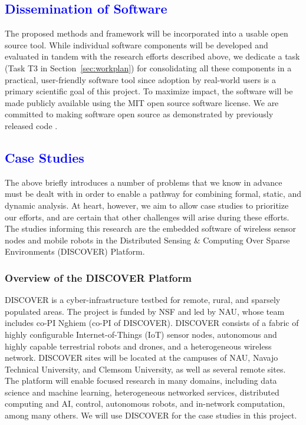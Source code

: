 \subsection{\textcolor{blue}{Dissemination of Software}}
\label{sec:software}

The proposed methods and framework will be incorporated into a usable
open source tool.
While individual software components will be developed and evaluated
in tandem with the research efforts described above, we dedicate a
task (Task T3 in Section~\ref{sec:workplan}) for consolidating all
these components in a practical, user-friendly software tool since
adoption by real-world users is a primary scientific goal of this project.
To maximize impact, the software will be made publicly available %
using the MIT open source software license.
We are committed to making software open source as demonstrated by previously released %
code \cite{mleplussoftware, bernalMLEToolIntegrated2012a, openbuildnetsoftware, nghiemOpenBuildNetFrameworkDistributed2016}.


\subsection{\textcolor{blue}{Case Studies}} %
\label{sec:case-study}

The above briefly introduces a number of problems that we know in advance must
be dealt with in order to enable a pathway for combining formal,
static, and dynamic analysis.    At heart, however, we aim to allow
case studies to prioritize our efforts, and
are certain that other challenges will arise during these efforts.
The studies informing this research are the embedded software of %
wireless sensor nodes and mobile robots in the Distributed Sensing \& Computing Over Sparse Environments (DISCOVER) Platform.

\subsubsection{Overview of the DISCOVER Platform}
\label{sec:cast-study:discover}

DISCOVER %
is a cyber-infrastructure testbed for remote, rural, and sparsely populated areas.
The project is funded by NSF and led by NAU, whose team includes co-PI Nghiem (co-PI of DISCOVER).
DISCOVER consists of a fabric of highly configurable Internet-of-Things (IoT) sensor nodes, autonomous and highly capable terrestrial robots and drones, and a heterogeneous wireless network.
DISCOVER sites will be located at the campuses of NAU, Navajo Technical University, and Clemsom University, as well as several remote sites.
The platform will enable focused research in many domains, including data science and machine learning, heterogeneous networked services, distributed computing and AI, control, autonomous robots, and in-network computation, among many others.
%
We will use DISCOVER for the case studies in this project.

